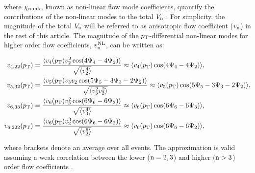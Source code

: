 where $\chi_{\rm n,mk}$, known as non-linear flow mode coefficients, quantify the contributions of the non-linear modes to the total $V_{\rm n}$ \cite{Yan:2015jma, Acharya:2017zfg}. For simplicity, the magnitude of the total $V_{\rm n}$ will be referred to as anisotropic flow coefficient ($v_{\rm n}$) in the rest of this article. 
The magnitude of the $p_{\rm{T}}$-differential non-linear modes for higher order flow coefficients, $v_{\rm n}^{\rm{NL}}$, can be written as: 

\begin{align}
v_{4,22}(p_{\rm{T}})&= \frac{\langle v_{4}(p_{\rm{T}})v_{2}^{2}\cos(4\Psi_{4}-4\Psi_{2})\rangle}{\sqrt{\langle v_{2}^{4}\rangle}} \approx \langle v_{4}(p_{\rm{T}})\cos(4\Psi_{4}-4\Psi_{2})\rangle, \label{Eq:V422}\\
v_{5,32}(p_{\rm{T}})&= \frac{\langle v_{5}(p_{\rm{T}})v_{3}v_{2}\cos(5\Psi_{5}-3\Psi_{3}-2\Psi_{2})\rangle}{\sqrt{\langle v_{3}^{2}v_{2}^{2}\rangle}} \approx \langle v_{5}(p_{\rm{T}})\cos(5\Psi_{5}-3\Psi_{3}-2\Psi_{2})\rangle, \label{Eq:V532}\\
v_{6,33}(p_{\rm{T}}) &= \frac{\langle v_{6}(p_{\rm{T}})v_{3}^{2}\cos(6\Psi_{6}-6\Psi_{3})\rangle}{\sqrt{\langle v_{3}^{4}\rangle}} \approx \langle v_{6}(p_{\rm{T}})\cos(6\Psi_{6}-6\Psi_{3})\rangle , \label{Eq:V633}\\
v_{6,222}(p_{\rm{T}}) &= \frac{\langle v_{6}(p_{\rm{T}})v_{2}^{3}\cos(6\Psi_{6}-6\Psi_{2})\rangle}{\sqrt{\langle v_{2}^{6}\rangle}} \approx \langle v_{6}(p_{\rm{T}})\cos(6\Psi_{6}-6\Psi_{2})\rangle,
\label{Eq:V6222}
\end{align}

\noindent where brackets denote an average over all events. The approximation is valid assuming a weak correlation between the lower (${\rm n}=2,3$) and higher (${\rm n}>3$) order flow coefficients \cite{Acharya:2017gsw, Bhalerao:2014xra}.

